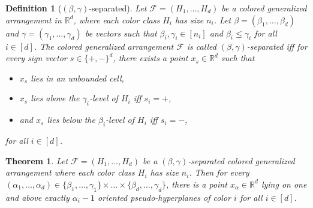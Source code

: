 \documentclass[10pt,a4paper]{amsart}
\newtheorem{definition}{Definition}
\newtheorem{theorem}{Theorem}
\begin{document}
\begin{definition}[$(\beta,\gamma)$-separated]
\label{def:generalized_separation}
Let $\mathcal{F}=(H_1, \dots, H_d)$ be a colored generalized arrangement in $\mathbb{R}^d$, where each color class $H_i$ has size $n_i$. Let $\beta=(\beta_1,\ldots,\beta_d)$ and $\gamma=(\gamma_1,\ldots,\gamma_d)$ be vectors such that $\beta_i, \gamma_i \in [n_i]$ and $\beta_i\leq \gamma_i$ for all $i \in [d]$.
The colored generalized arrangement $\mathcal{F}$ is called \emph{$(\beta,\gamma)$-separated} iff for every sign vector $s \in \{+, -\}^d$, there exists a point $x_s \in \mathbb{R}^d$ such that 
\begin{itemize}
	\item $x_s$ lies in an unbounded cell,
    \item $x_s$ lies above the $\gamma_i$-level of $H_i$ iff $s_i = +$,
    \item and $x_s$ lies below the $\beta_i$-level of $H_i$ iff $s_i = -$,
\end{itemize}
for all $i \in [d]$.
\end{definition}

\begin{theorem}
\label{thm:beta-gamma}
Let $\mathcal{F}=(H_1, \ldots,H_d)$ be a $(\beta,\gamma)$-separated colored generalized arrangement where each color class $H_i$ has size $n_i$. Then for every $(\alpha_1, \dots, \alpha_d) \in \{\beta_1,\ldots,\gamma_1\} \times \dots \times \{\beta_d,\ldots,\gamma_d\}$, there is a point $x_{\alpha} \in \mathbb{R}^d$ lying on one and above exactly $\alpha_i - 1$ oriented pseudo-hyperplanes of color $i$ for all $i \in [d]$.
\end{theorem}
\end{document}
